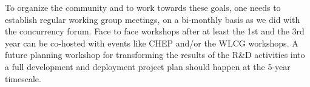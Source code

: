 \documentclass[12pt,a4paper]{article}
\begin{document}
To organize the community and to work towards these goals, one needs
to establish regular working group meetings, on a bi-monthly basis as
we did with the concurrency forum. Face to face workshops after at
least the 1st and the 3rd year can be co-hosted with events like CHEP
and/or the WLCG workshops. A future planning workshop for transforming
the results of the R\&D activities into a full development and
deployment project plan should happen at the 5-year timescale.


\sloppy
\raggedright
\clearpage
\printbibliography[title={References},heading=bibintoc]
\end{document}
